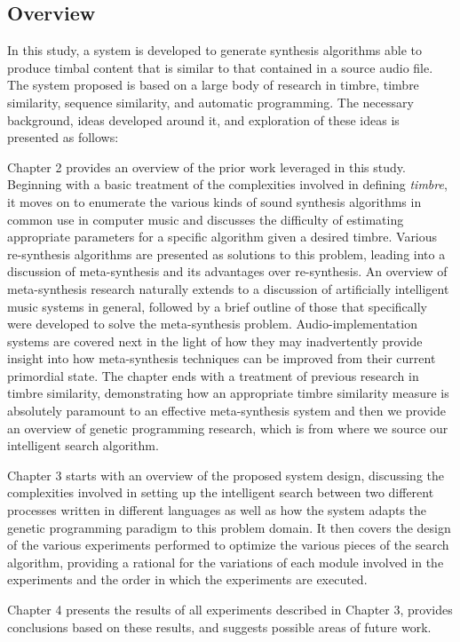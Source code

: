 \documentclass[a4paper,12pt]{report} 	%
\numberwithin{figure}{chapter}
\numberwithin{table}{chapter}
\numberwithin{equation}{chapter}
\begin{document}
\begin{flushleft}
\section{Overview}
In this study, a system is developed to generate synthesis algorithms able to produce timbal content that is similar to that contained in a source audio file. The system proposed is based on a large body of research in timbre, timbre similarity, sequence similarity, and automatic programming. The necessary background, ideas developed around it, and exploration of these ideas is presented as follows:

Chapter 2 provides an overview of the prior work leveraged in this study. Beginning with a basic treatment of the complexities involved in defining \emph{timbre}, it moves on to enumerate the various kinds of sound synthesis algorithms in common use in computer music and discusses the difficulty of estimating appropriate parameters for a specific algorithm given a desired timbre. Various re-synthesis algorithms are presented as solutions to this problem, leading into a discussion of meta-synthesis and its advantages over re-synthesis. An overview of meta-synthesis research naturally extends to a discussion of artificially intelligent music systems in general, followed by a brief outline of those that specifically were developed to solve the meta-synthesis problem. Audio-implementation systems are covered next in the light of how they may inadvertently provide insight into how meta-synthesis techniques can be improved from their current primordial state. The chapter ends with a treatment of previous research in timbre similarity, demonstrating how an appropriate timbre similarity measure is absolutely paramount to an effective meta-synthesis system and then we provide an overview of genetic programming research, which is from where we source our intelligent search algorithm.

Chapter 3 starts with an overview of the proposed system design, discussing the complexities involved in setting up the intelligent search between two different processes written in different languages as well as how the system adapts the genetic programming paradigm to this problem domain. It then covers the design of the various experiments performed to optimize the various pieces of the search algorithm, providing a rational for the variations of each module involved in the experiments and the order in which the experiments are executed.

Chapter 4 presents the results of all experiments described in Chapter 3, provides conclusions based on these results, and suggests possible areas of future work.


\end{flushleft}
\end{document}
